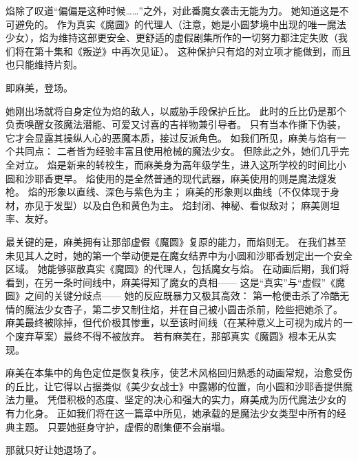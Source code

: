 焰除了叹道“偏偏是这种时候……”之外，对此番魔女袭击无能为力。
她知道这是不可避免的。
作为真实《魔圆》的代理人（注意，她是小圆梦境中出现的唯一魔法少女），焰为维持这部更安全、更舒适的虚假剧集所作的一切努力都注定失败（我们将在第十集和《叛逆》中再次见证）。
这种保护只有焰的对立项才能做到，而且也只能维持片刻。

即麻美，登场。

她刚出场就将自身定位为焰的敌人，以威胁手段保护丘比。
此时的丘比仍是那个负责唤醒女孩魔法潜能、可爱又讨喜的吉祥物兼引导者。
只有当本作撕下伪装，它才会显露其操纵人心的恶魔本质，接过反派角色。
如我们所见，麻美与焰有一个共同点：
二者皆为经验丰富且使用枪械的魔法少女。
但除此之外，她们几乎完全对立。
焰是新来的转校生，而麻美身为高年级学生，进入这所学校的时间比小圆和沙耶香更早。
焰使用的是全然普通的现代武器，麻美使用的则是魔法燧发枪。
焰的形象以直线、深色与紫色为主；
麻美的形象则以曲线（不仅体现于身材，亦见于发型）以及白色和黄色为主。
焰封闭、神秘、看似敌对；
麻美则坦率、友好。

最关键的是，麻美拥有让那部虚假《魔圆》复原的能力，而焰则无。
在我们甚至未见其人之时，她的第一个举动便是在魔女结界中为小圆和沙耶香划定出一个安全区域。
她能够驱散真实《魔圆》的代理人，包括魔女与焰。
在动画后期，我们将看到，在另一条时间线中，麻美得知了魔女的真相——
这是“真实”与“虚假”《魔圆》之间的关键分歧点——
她的反应既暴力又极其高效：
第一枪便击杀了冷酷无情的魔法少女杏子，第二步又制住焰，并在自己被小圆击杀前，险些把她杀了。
麻美最终被除掉，但代价极其惨重，以至该时间线（在某种意义上可视为成片的一个废弃草案）最终不得不被放弃。
若有麻美在，那部真实《魔圆》根本无从实现。

麻美在本集中的角色定位是恢复秩序，使艺术风格回归熟悉的动画常规，治愈受伤的丘比，让它得以占据类似《美少女战士》中露娜的位置，向小圆和沙耶香提供魔法力量。
凭借积极的态度、坚定的决心和强大的实力，麻美成为历代魔法少女的有力化身。
正如我们将在这一篇章中所见，她承载的是魔法少女类型中所有的经典主题。
只要她挺身守护，虚假的剧集便不会崩塌。

那就只好让她退场了。
